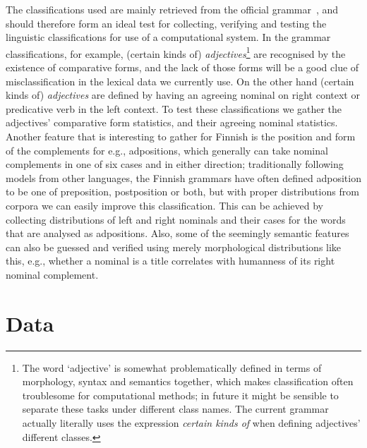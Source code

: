 \documentclass[a5paper]{article}
\begin{document}
The classifications used
are mainly retrieved from the official grammar~\cite{visk}, and should
therefore form an ideal test for collecting, verifying and testing the
linguistic classifications for use of a computational system. In the grammar
classifications, for example, (certain kinds of) \emph{adjectives}\footnote{The word
    `adjective' is somewhat problematically defined in terms of
    morphology, syntax and semantics together, which makes classification often
    troublesome for computational methods; in future it might be sensible to
separate these tasks under different class names. The current grammar actually
literally uses the expression \emph{certain kinds of} when defining adjectives'
different classes.} are recognised by the existence of comparative forms, and
the lack of those forms will be a good clue of misclassification in the lexical
data we currently use. On the other hand (certain kinds of) \emph{adjectives}
are defined by having an agreeing nominal on right context or predicative verb
in the left context. To test these classifications we gather the adjectives'
comparative form statistics, and their agreeing nominal statistics. Another
feature that is interesting to gather for Finnish is the position and form of
the complements for e.g., adpositions, which generally can take nominal
complements in one of six cases and in either direction; traditionally
following models from other languages, the Finnish grammars have often defined
adposition to be one of preposition, postposition or both, but with proper
distributions from corpora we can easily improve this classification. This can be
achieved by collecting distributions of left and right nominals and their cases
for the words that are analysed as adpositions. Also, some of the seemingly
semantic features can also be guessed and verified using merely morphological
distributions like this, e.g., whether a nominal is a title correlates with
humanness of its right nominal complement.

\section{Data}
\end{document}

